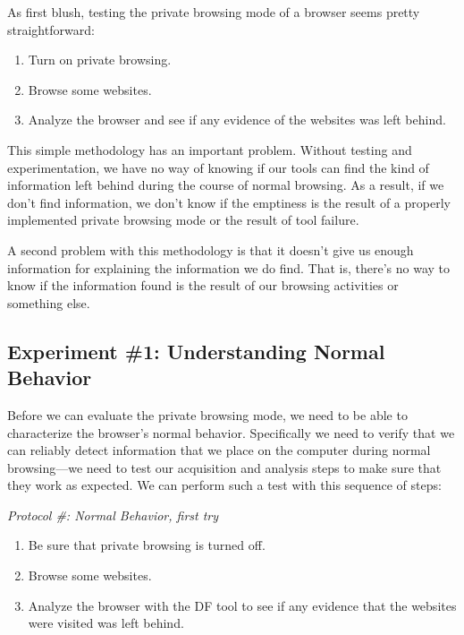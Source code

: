 As first blush, testing the private browsing mode of a browser seems
pretty straightforward:

\begin{enumerate}
\item Turn on private browsing.
\item Browse some websites.
\item Analyze the browser and see if any evidence of the websites was
  left behind. 
\end{enumerate}

This simple methodology has an important problem. Without testing and
experimentation, we have no way of knowing if our tools can find the
kind of information left behind during the course of normal
browsing. As a result, if we don't find information, we don't know if
the emptiness is the result of a properly implemented private browsing
mode or the result of tool failure.

A second problem with this methodology is that it doesn't give us
enough information for explaining the information we do find. That is,
there's no way to know if the information found is the result of our
browsing activities or something else.

\subsection{Experiment \#1: Understanding Normal Behavior}

Before we can evaluate the private browsing mode, we need to be able
to characterize the browser's normal behavior. Specifically we need to
verify that we can reliably detect information that we place on the computer
during normal browsing---we need to test our acquisition and analysis
steps to make sure that they work as expected. We can perform such a test with this sequence of steps:

\setcounter{protocol}{0}
\newcommand{\protocol}[1]{\noindent\textit{Protocol \#: #1}}


\protocol{Normal Behavior, first try}
\begin{enumerate}
\item Be sure that private browsing is turned off.
\item Browse some websites.
\item Analyze the browser with the DF tool to see if any evidence that the websites
  were visited was left behind. 
\end{enumerate}

